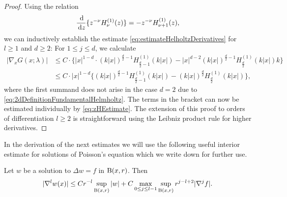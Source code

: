 \begin{proof}
  Using the relation
  \begin{align*}
    \frac{\, {\operatorname{d}\!{}}}{\, {\operatorname{d}\!{z}}} \{ z^{-\nu} H_\nu^{(1)}(z) \} = -z^{-\nu} H_{\nu + 1}^{(1)} (z),
  \end{align*}
  we can inductively establish the estimate \eqref{eq:estimateHelholtzDerivatives} for $l \geq 1$ and $d \geq 2$:
  For $1 \leq j \leq d$, we calculate
  \begin{align*}
    |\nabla_x^{} G(x; \lambda)|
    &\leq C  \cdot \big\{|x|^{1 - d} \cdot (k|x|)^{\frac{d}{2} - 1} H_{\frac{d}{2} - 1}^{(1)}(k|x|) - |x|^{d - 2} (k|x|)^{\frac{d}{2} - 1} H_{\frac{d}{2}}^{(1)}(k|x|) k\big\} \\
    &\leq C \cdot |x|^{1 - d}\big\{(k|x|)^{\frac{d}{2} - 1} H_{\frac{d}{2} - 1}^{(1)}(k|x|) -  (k|x|)^{\frac{d}{2}} H_{\frac{d}{2}}^{(1)}(k|x|) \big\},
  \end{align*}
  where the first summand does not arise in the case $d = 2$ due to \eqref{eq:2dDefinitionFundamentalHelmholtz}.
  The terms in the bracket can now be estimated individually by \eqref{eq:zHEstimate}.
  The extension of this proof to orders of differentiation $l \geq 2$ is straightforward using the Leibniz product rule for higher derivatives.
\end{proof}

In the derivation of the next estimates we will use the following useful interior estimate for solutions of Poisson's equation which we write down for further use.

\begin{lem}
  \label{lem:interiorEstimatePoisson}
  Let $w$ be a solution to $\Delta w = f$ in $\mathrm{B}(x,r)$. Then
  \begin{align}
    \label{eq:interiorEstimatePoisson}
    |\nabla^l w(x)| \leq C r^{-l} \sup_{\mathrm{B}(x,r)} |w| + C \max_{0 \leq j \leq l - 1} \sup_{\mathrm{B}(x,r)} r^{j - l + 2} |\nabla^j f|.
  \end{align}
\end{lem}


